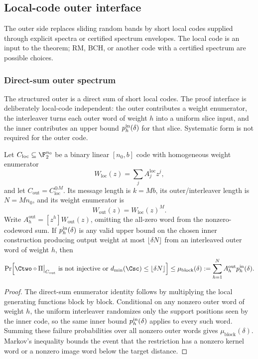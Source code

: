 \subsection{Local-code outer interface}
\label{sec:local-code-outer}

The outer side replaces sliding random bands by short local codes supplied
through explicit spectra or certified spectrum envelopes.  The local code is an
input to the theorem; RM, BCH, or another code with a certified spectrum are
possible choices.

\subsubsection{Direct-sum outer spectrum}
\label{subsec:local-code-outer-interface}

The structured outer is a direct sum of short local codes.  The proof interface
is deliberately local-code independent: the outer contributes a weight
enumerator, the interleaver turns each outer word of weight \(h\) into a uniform
slice input, and the inner contributes an upper bound
\(p_h^{\rm in}(\delta)\) for that slice.  Systematic form is not required for
the outer code.

\begin{lemma}
\label{lem:block-outer-first-moment-interface}
Let \(C_{\mathrm{loc}}\subseteq\F_2^{n_0}\) be a binary linear \([n_0,b]\) code
with homogeneous weight enumerator
\[
W_{\mathrm{loc}}(z)=\sum_j A^{\mathrm{loc}}_j z^j,
\]
and let \(C_{\mathrm{out}}=C_{\mathrm{loc}}^{\oplus M}\).  Its message length
is \(k=Mb\), its outer/interleaver length is \(N=Mn_0\), and its weight
enumerator is
\[
W_{\mathrm{out}}(z)=W_{\mathrm{loc}}(z)^M .
\]
Write \(A_h^{\mathrm{out}}=[z^h]W_{\mathrm{out}}(z)\), omitting the all-zero
word from the nonzero-codeword sum.  If \(p_h^{\rm in}(\delta)\) is any valid
upper bound on the chosen inner construction producing output weight at most
\(\lfloor\delta N\rfloor\) from an interleaved outer word of weight \(h\), then
\[
\Pr\Bigl[
 \Ctwo\circ\Pi\big|_{C_{\mathrm{out}}}\text{ is not injective}
 \ \text{or}\ d_{\min}(\Csc)\le \lfloor\delta N\rfloor
\Bigr]
\le
\mu_{\mathrm{block}}(\delta)
:=
\sum_{h=1}^{N} A_h^{\mathrm{out}}p_h^{\rm in}(\delta).
\]
\end{lemma}

\begin{proof}
The direct-sum enumerator identity follows by multiplying the local generating
functions block by block.  Conditional on any nonzero outer word of weight
\(h\), the uniform interleaver randomizes only the support positions seen by
the inner code, so the same inner bound \(p_h^{\rm in}(\delta)\) applies to
every such word.  Summing these failure probabilities over all nonzero outer
words gives \(\mu_{\mathrm{block}}(\delta)\).  Markov's inequality bounds the
event that the restriction has a nonzero kernel word or a nonzero image word
below the target distance.
\end{proof}

